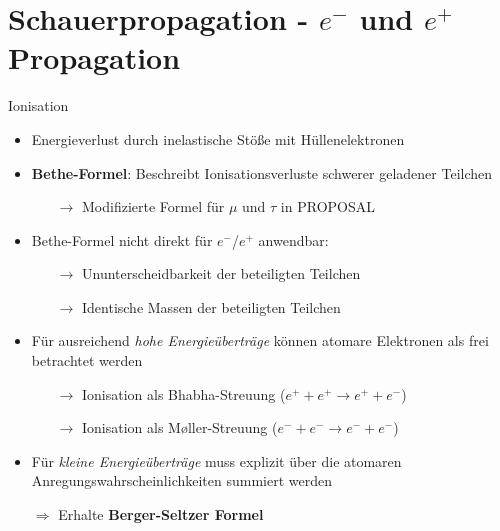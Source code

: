\documentclass[aspectratio=1610, captions=tableheading, 11pt]{beamer}
\begin{document}
\section{Schauerpropagation - $e^-$ und $e^+$ Propagation}


\begin{frame}{Ionisation}
	 \begin{itemize}
	 	\setlength\itemsep{0.5em}
	 	\item Energieverlust durch inelastische Stöße mit Hüllenelektronen
	 	\item \textbf{Bethe-Formel}: Beschreibt Ionisationsverluste schwerer geladener Teilchen
	 	\begin{itemize}
          \item[$\rightarrow$] Modifizierte Formel für $\mu$ und $\tau$ in PROPOSAL
	 	\end{itemize}
	 	\vspace{5mm}
	 	\item Bethe-Formel nicht direkt für $e^-$/$e^+$ anwendbar:
	 	\begin{itemize}
          \item[$\rightarrow$] Ununterscheidbarkeit der beteiligten Teilchen
          \item[$\rightarrow$] Identische Massen der beteiligten Teilchen
	 	\end{itemize}
	 \end{itemize}
\end{frame}


\begin{frame}
	 \begin{itemize}
	 	\setlength\itemsep{0.5em}
	 	\item Für ausreichend \emph{hohe Energieüberträge} können atomare Elektronen als frei betrachtet werden
	 	\begin{itemize}
          \item[$\rightarrow$] Ionisation als Bhabha-Streuung ($ e^+ + e^+ \rightarrow e^+ + e^- $)
          \item[$\rightarrow$] Ionisation als Møller-Streuung ($ e^- + e^- \rightarrow e^- + e^- $)
	 	\end{itemize}
        \item Für \emph{kleine Energieüberträge} muss explizit über die atomaren Anregungswahrscheinlichkeiten summiert werden
		\item[$\Rightarrow$]Erhalte \textbf{Berger-Seltzer Formel}
	 \end{itemize}
\end{frame}
\end{document}
